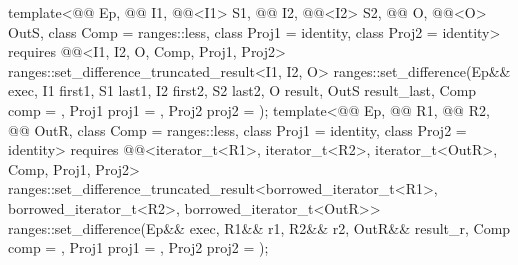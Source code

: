 \begin{itemdecl}
template<@@ Ep, @@ I1, @@<I1> S1,
         @@ I2, @@<I2> S2,
         @@ O, @@<O> OutS, class Comp = ranges::less,
         class Proj1 = identity, class Proj2 = identity>
  requires @@<I1, I2, O, Comp, Proj1, Proj2>
  ranges::set_difference_truncated_result<I1, I2, O>
    ranges::set_difference(Ep&& exec, I1 first1, S1 last1,
                           I2 first2, S2 last2, O result, OutS result_last,
                           Comp comp = {}, Proj1 proj1 = {}, Proj2 proj2 = {});
template<@@ Ep, @@ R1, @@ R2,
         @@ OutR, class Comp = ranges::less,
         class Proj1 = identity, class Proj2 = identity>
  requires @@<iterator_t<R1>, iterator_t<R2>, iterator_t<OutR>, Comp, Proj1, Proj2>
  ranges::set_difference_truncated_result<borrowed_iterator_t<R1>, borrowed_iterator_t<R2>,
                                          borrowed_iterator_t<OutR>>
    ranges::set_difference(Ep&& exec, R1&& r1, R2&& r2, OutR&& result_r, Comp comp = {},
                           Proj1 proj1 = {}, Proj2 proj2 = {});
\end{itemdecl}

